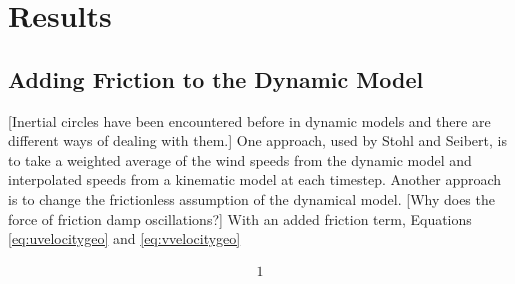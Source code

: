 \chapter{Results}

\section{Adding Friction to the Dynamic Model}

[Inertial circles have been encountered before in dynamic models and there are different ways of dealing with them.] \cite{stohl_accuracy_1998}
One approach, used by Stohl and Seibert, is to take a weighted average of the wind speeds from the dynamic model and interpolated speeds from a kinematic model at each timestep.
Another approach is to change the frictionless assumption of the dynamical model.
[Why does the force of friction damp oscillations?]
With an added friction term, Equations \ref{eq:uvelocitygeo} and \ref{eq:vvelocitygeo} 

\begin{align}
    1   
\end{align}

